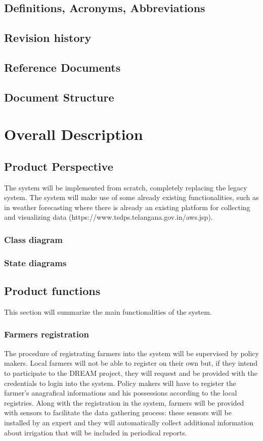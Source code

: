 \documentclass[10pt]{article}
\begin{document}
\subsection{Definitions, Acronyms, Abbreviations}
\subsection{Revision history}
\subsection{Reference Documents}
\subsection{Document Structure}
\newpage
\section{Overall Description}
\subsection{Product Perspective}
The system will be implemented from scratch, completely replacing the legacy system.
The system will make use of some already existing functionalities, such as in weather forecasting where there is 
already an existing platform for collecting and visualizing data (https://www.tsdps.telangana.gov.in/aws.jsp).
\subsubsection{Class diagram}
\subsubsection{State diagrams}
\subsection{Product functions}
This section will summarize the main functionalities of the system.
\subsubsection{Farmers registration}
The procedure of registrating farmers into the system will be supervised by policy makers. Local farmers will not be able to register on their own
but, if they intend to participate to the DREAM project, they will request and be provided with the credentials to login into the system. Policy makers will have to 
register the farmer's anagrafical informations and his possessions according to the local registries. Along with the registration in the system, farmers will be provided with
sensors to facilitate the data gathering process: these sensors will be installed by an expert and they will automatically collect additional information about irrigation that 
will be included in periodical reports.
\end{document}
